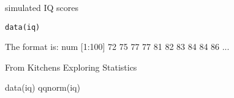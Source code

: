 \begin{Description}\relax
simulated IQ scores
\end{Description}
\begin{Usage}
\begin{verbatim}data(iq)\end{verbatim}
\end{Usage}
\begin{Format}\relax
The format is:
num [1:100] 72 75 77 77 81 82 83 84 84 86 ...
\end{Format}
\begin{Source}\relax
From Kitchens Exploring Statistics
\end{Source}
\begin{Examples}
\begin{ExampleCode}
data(iq)
qqnorm(iq)
\end{ExampleCode}
\end{Examples}

